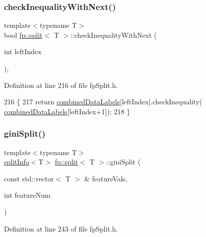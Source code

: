 \subsubsection{\texorpdfstring{check\+Inequality\+With\+Next()}{checkInequalityWithNext()}}
{\footnotesize\ttfamily template$<$typename T$>$ \\
bool \hyperlink{classfp_1_1split}{fp\+::split}$<$ T $>$\+::check\+Inequality\+With\+Next (\begin{DoxyParamCaption}\item[{int}]{left\+Index }\end{DoxyParamCaption})\hspace{0.3cm}{\ttfamily [inline]}, {\ttfamily [protected]}}



Definition at line 216 of file fp\+Split.\+h.


\begin{DoxyCode}
216                                                                   \{
217                     \textcolor{keywordflow}{return} \hyperlink{classfp_1_1split_ac8f54cf4a42335814e10e351c49e3c32}{combinedDataLabels}[leftIndex].checkInequality(
      \hyperlink{classfp_1_1split_ac8f54cf4a42335814e10e351c49e3c32}{combinedDataLabels}[leftIndex+1]);
218                 \}
\end{DoxyCode}
\mbox{\label{classfp_1_1split_a6a98f17c8b3fc3b8047e4559f8b618b7}} 
\subsubsection{\texorpdfstring{gini\+Split()}{giniSplit()}}
{\footnotesize\ttfamily template$<$typename T$>$ \\
\hyperlink{classfp_1_1splitInfo}{split\+Info}$<$T$>$ \hyperlink{classfp_1_1split}{fp\+::split}$<$ T $>$\+::gini\+Split (\begin{DoxyParamCaption}\item[{const std\+::vector$<$ T $>$ \&}]{feature\+Vals,  }\item[{int}]{feature\+Num }\end{DoxyParamCaption})\hspace{0.3cm}{\ttfamily [inline]}}



Definition at line 243 of file fp\+Split.\+h.


